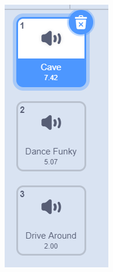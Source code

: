 \documentclass[10pt, a4paper]{article}
\begin{document}
\begin{enumerate}
\begin{figure}[htbp]
\begin{minipage}[t]{.24\textwidth}
\begin{minipage}[t]{.38\textwidth}
                    \includegraphics[width=.8\textwidth]{34-1.png}
                \end{minipage}
                \begin{minipage}[t]{.58\textwidth}

\end{minipage}
\end{minipage}
\end{figure}
\end{enumerate}
\end{document}
